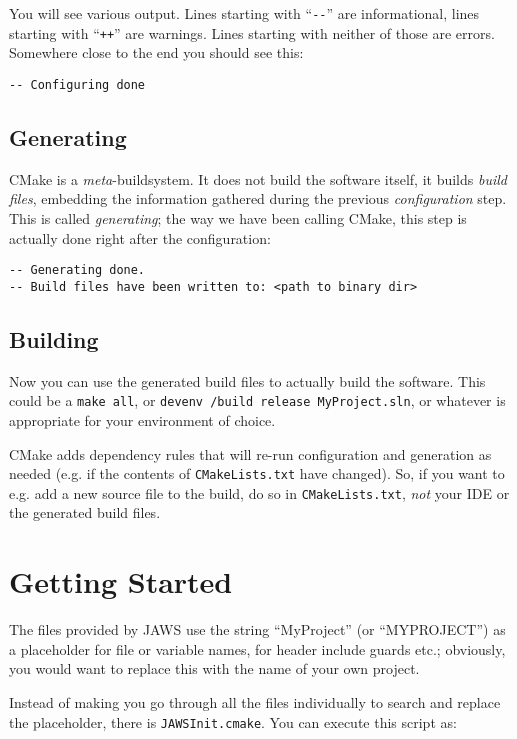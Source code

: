 You will see various output. Lines starting with ``\lstinline{--}'' are informational, lines starting with ``\lstinline{++}'' are warnings. Lines starting with neither of those are errors. Somewhere close to the end you should see this:

\begin{lstlisting}
-- Configuring done
\end{lstlisting}

\subsection{Generating}

CMake is a \emph{meta}-buildsystem. It does not build the software itself, it builds \emph{build files}, embedding the information gathered during the previous \emph{configuration} step. This is called \emph{generating}; the way we have been calling CMake, this step is actually done right after the configuration:

\begin{lstlisting}
-- Generating done.
-- Build files have been written to: <path to binary dir>
\end{lstlisting}

\subsection{Building}

Now you can use the generated build files to actually build the software. This could be a \lstinline{make all}, or \lstinline{devenv /build release MyProject.sln}, or whatever is appropriate for your environment of choice.

CMake adds dependency rules that will re-run configuration and generation as needed (e.g. if the contents of \lstinline{CMakeLists.txt} have changed). So, if you want to e.g. add a new source file to the build, do so in \lstinline{CMakeLists.txt}, \emph{not} your IDE or the generated build files.

\section{Getting Started}

The files provided by JAWS use the string ``MyProject'' (or ``MYPROJECT'') as a placeholder for file or variable names, for header include guards etc.; obviously, you would want to replace this with the name of your own project.

Instead of making you go through all the files individually to search and replace the placeholder, there is \lstinline{JAWSInit.cmake}. You can execute this script as:

